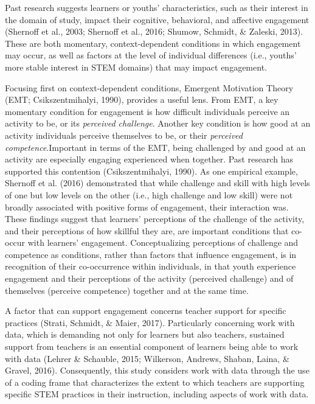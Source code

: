 \documentclass[]{book}
\theoremstyle{definition}
\theoremstyle{definition}
\theoremstyle{definition}
\theoremstyle{remark}
\begin{document}
Past research suggests learners or youths' characteristics, such as
their interest in the domain of study, impact their cognitive,
behavioral, and affective engagement (Shernoff et al., 2003; Shernoff et
al., 2016; Shumow, Schmidt, \& Zaleski, 2013). These are both momentary,
context-dependent conditions in which engagement may occur, as well as
factors at the level of individual differences (i.e., youths' more
stable interest in STEM domains) that may impact engagement.

Focusing first on context-dependent conditions, Emergent Motivation
Theory (EMT; Csikszentmihalyi, 1990), provides a useful lens. From EMT,
a key momentary condition for engagement is how difficult individuals
perceive an activity to be, or its \emph{perceived challenge}. Another
key condition is how good at an activity individuals perceive themselves
to be, or their \emph{perceived competence}.Important in terms of the
EMT, being challenged by and good at an activity are especially engaging
experienced when together. Past research has supported this contention
(Csikszentmihalyi, 1990). As one empirical example, Shernoff et al.
(2016) demonstrated that while challenge and skill with high levels of
one but low levels on the other (i.e., high challenge and low skill)
were not broadly associated with positive forms of engagement, their
interaction was. These findings suggest that learners' perceptions of
the challenge of the activity, and their perceptions of how skillful
they are, are important conditions that co-occur with learners'
engagement. Conceptualizing perceptions of challenge and competence as
conditions, rather than factors that influence engagement, is in
recognition of their co-occurrence within individuals, in that youth
experience engagement and their perceptions of the activity (perceived
challenge) and of themselves (perceive competence) together and at the
same time.

A factor that can support engagement concerns teacher support for
specific practices (Strati, Schmidt, \& Maier, 2017). Particularly
concerning work with data, which is demanding not only for learners but
also teachers, sustained support from teachers is an essential component
of learners being able to work with data (Lehrer \& Schauble, 2015;
Wilkerson, Andrews, Shaban, Laina, \& Gravel, 2016). Consequently, this
study considers work with data through the use of a coding frame that
characterizes the extent to which teachers are supporting specific STEM
practices in their instruction, including aspects of work with data.
\end{document}
